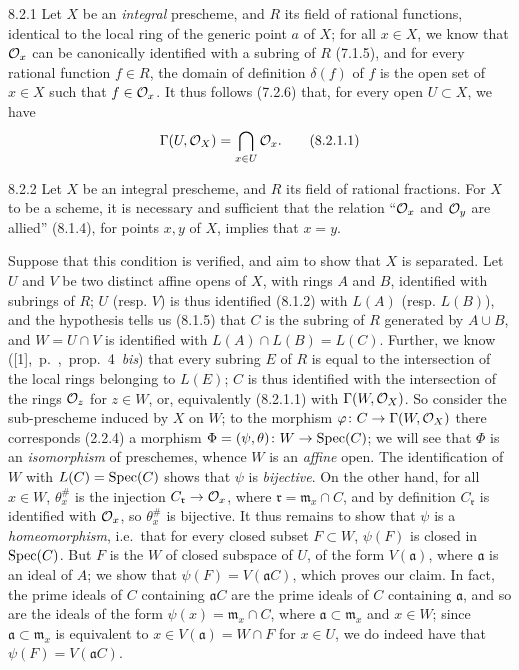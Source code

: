 \documentclass[../main.tex]{subfiles}
\begin{document}
\begin{env}{8.2.1}
    Let $X$ be an \emph{integral} prescheme, and $R$ its field of rational functions, identical to the local ring of the generic point $a$ of $X$; for all $x\in X$, we know that $\mathcal{O}_x$ can be canonically identified with a subring of $R$ (7.1.5), and for every rational function $f\in R$, the domain of definition $\delta(f)$ of $f$ is the open set of $x\in X$ such that $f\in\mathcal{O}_x$.
    It thus follows (7.2.6) that, for every open $U\subset X$, we have
    \begin{equation*}
        \Gamma(U,\mathcal{O}_X) = \bigcap_{x\in U}\mathcal{O}_x.\tag{8.2.1.1}
    \end{equation*}
\end{env}

\begin{env}[Proposition]{8.2.2}
    Let $X$ be an integral prescheme, and $R$ its field of rational fractions.
    For $X$ to be a scheme, it is necessary and sufficient that the relation ``$\mathcal{O}_x$ and $\mathcal{O}_y$ are allied'' (8.1.4), for points $x,y$ of $X$, implies that $x=y$.
\end{env}

Suppose that this condition is verified, and aim to show that $X$ is separated.
Let $U$ and $V$ be two distinct affine opens of $X$, with rings $A$ and $B$, identified with subrings of $R$; $U$ (resp. $V$) is thus identified (8.1.2) with $L(A)$ (resp. $L(B)$), and the hypothesis tells us (8.1.5) that $C$ is the subring of $R$ generated by $A\cup B$, and $W=U\cap V$ is identified with $L(A)\cap L(B)=L(C)$.
Further, we know ([1],~p.~,~prop.~4~\emph{bis}) that every subring $E$ of $R$ is equal to the intersection of the local rings belonging to $L(E)$; $C$ is thus identified with the intersection of the rings $\mathcal{O}_z$ for $z\in W$, or, equivalently (8.2.1.1) with $\Gamma(W,\mathcal{O}_X)$.
So consider the sub-prescheme induced by $X$ on $W$; to the  morphism $\varphi\colon C\to\Gamma(W,\mathcal{O}_X)$ there corresponds (2.2.4) a morphism $\Phi=(\psi,\theta)\colon W\to\operatorname{Spec}(C)$; we will see that $\Phi$ is an \emph{isomorphism} of preschemes, whence $W$ is an \emph{affine} open.
The identification of $W$ with $L(C)=\operatorname{Spec}(C)$ shows that $\psi$ is \emph{bijective}.
On the other hand, for all $x\in W$, $\theta_x^\#$ is the injection $C_\mathfrak{r}\to\mathcal{O}_x$, where $\mathfrak{r}=\mathfrak{m}_x\cap C$, and by definition $C_\mathfrak{r}$ is identified with $\mathcal{O}_x$, so $\theta_x^\#$ is bijective.
It thus remains to show that $\psi$ is a \emph{homeomorphism}, i.e.\ that for every closed subset $F\subset W$, $\psi(F)$ is closed in $\operatorname{Spec}(C)$.
But $F$ is the  $W$ of closed subspace of $U$, of the form $V(\mathfrak{a})$, where $\mathfrak{a}$ is an ideal of $A$; we show that $\psi(F)=V(\mathfrak{a}C)$, which proves our claim.
In fact, the prime ideals of $C$ containing $\mathfrak{a}C$ are the prime ideals of $C$ containing $\mathfrak{a}$, and so are the ideals of the form $\psi(x)=\mathfrak{m}_x\cap C$, where $\mathfrak{a}\subset\mathfrak{m}_x$ and $x\in W$; since $\mathfrak{a}\subset\mathfrak{m}_x$ is equivalent to $x\in V(\mathfrak{a})=W\cap F$ for $x\in U$, we do indeed have that $\psi(F)=V(\mathfrak{a}C)$.
\end{document}

